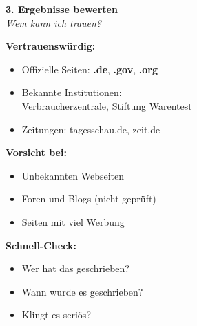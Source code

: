 \documentclass[a4paper,landscape,8pt]{extarticle}
\begin{document}
\begin{minipage}[t]{0.32\linewidth}
\begin{center}
\colorbox{successgreen!10}{%
\begin{minipage}{0.95\linewidth}
\vspace{2mm}
\begin{center}
{\Large\bfseries\textcolor{successgreen}{3. Ergebnisse bewerten}}\\[1pt]
{\footnotesize\itshape Wem kann ich trauen?}
\end{center}
\vspace{2mm}
\end{minipage}%
}
\end{center}

\vspace{1mm}

\textbf{Vertrauenswürdig:}
\begin{itemize}
\item Offizielle Seiten: \textbf{.de}, \textbf{.gov}, \textbf{.org}
\item Bekannte Institutionen:\\Verbraucherzentrale, Stiftung Warentest
\item Zeitungen: tagesschau.de, zeit.de
\end{itemize}

\textbf{Vorsicht bei:}
\begin{itemize}
\item Unbekannten Webseiten
\item Foren und Blogs (nicht geprüft)
\item Seiten mit viel Werbung
\end{itemize}

\textbf{Schnell-Check:}
\begin{itemize}
\item Wer hat das geschrieben?
\item Wann wurde es geschrieben?
\item Klingt es seriös?
\end{itemize}

\end{minipage}

\vspace{1mm}

\begin{center}
\end{center}
\end{document}
